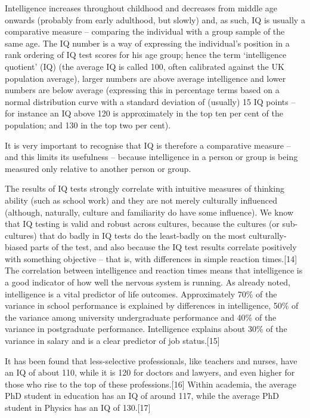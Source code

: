 \documentclass[
]{book}
\begin{document}
Intelligence increases throughout childhood and decreases from middle age onwards (probably from early adulthood, but slowly) and, as such, IQ is usually a comparative measure -- comparing the individual with a group sample of the same age. The IQ number is a way of expressing the individual's position in a rank ordering of IQ test scores for his age group; hence the term `intelligence quotient' (IQ) (the average IQ is called 100, often calibrated against the UK population average), larger numbers are above average intelligence and lower numbers are below average (expressing this in percentage terms based on a normal distribution curve with a standard deviation of (usually) 15 IQ points -- for instance an IQ above 120 is approximately in the top ten per cent of the population; and 130 in the top two per cent).

It is very important to recognise that IQ is therefore a comparative measure -- and this limits its usefulness -- because intelligence in a person or group is being measured only relative to another person or group.

The results of IQ tests strongly correlate with intuitive measures of thinking ability (such as school work) and they are not merely culturally influenced (although, naturally, culture and familiarity do have some influence). We know that IQ testing is valid and robust across cultures, because the cultures (or sub-cultures) that do badly in IQ tests do the least-badly on the most culturally-biased parts of the test, and also because the IQ test results correlate positively with something objective -- that is, with differences in simple reaction times.{[}14{]} The correlation between intelligence and reaction times means that intelligence is a good indicator of how well the nervous system is running.
As already noted, intelligence is a vital predictor of life outcomes. Approximately 70\% of the variance in school performance is explained by differences in intelligence, 50\% of the variance among university undergraduate performance and 40\% of the variance in postgraduate performance. Intelligence explains about 30\% of the variance in salary and is a clear predictor of job status.{[}15{]}

It has been found that less-selective professionals, like teachers and nurses, have an IQ of about 110, while it is 120 for doctors and lawyers, and even higher for those who rise to the top of these professions.{[}16{]} Within academia, the average PhD student in education has an IQ of around 117, while the average PhD student in Physics has an IQ of 130.{[}17{]}
\end{document}
